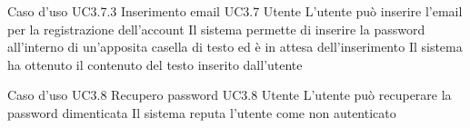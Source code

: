 \UCtitle
{Caso d'uso UC3.7.3}
{Inserimento email}
\UC
{UC3.7}
{Utente}
{L'utente può inserire l'email per la registrazione dell'account}
{Il sistema permette di inserire la password all'interno di un'apposita casella di testo ed è in attesa dell'inserimento}
\post
{Il sistema ha ottenuto il contenuto del testo inserito dall'utente}

\UCtitle
{Caso d'uso UC3.8}
{Recupero password}
\UC
{UC3.8}
{Utente}
{L'utente può recuperare la password dimenticata}
{Il sistema reputa l'utente come non autenticato}
